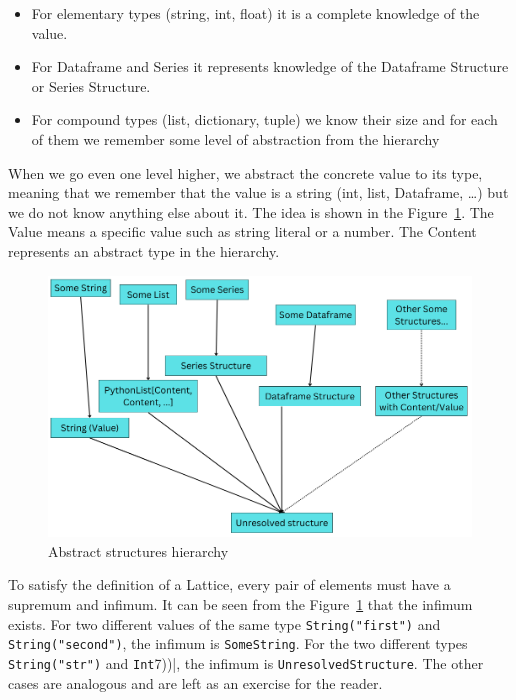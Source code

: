\begin{itemize}
    \item For elementary types (string, int, float) it is a complete knowledge of the value.
    \item For Dataframe and Series it represents knowledge of the Dataframe Structure or Series Structure.
    \item For compound types (list, dictionary, tuple) we know their size and for each of them we remember some level
    of abstraction from the hierarchy
\end{itemize}

When we go even one level higher, we abstract the concrete value to its type, meaning that we remember that the value
is a string (int, list, Dataframe, \ldots) but we do not know anything else about it.
The idea is shown in the Figure~\ref{fig:abstract_hierarchy}.
The Value means a specific value such as string literal or a number.
The Content represents an abstract type in the hierarchy.

\begin{figure}[H]
    \caption{Abstract structures hierarchy}
    \label{fig:abstract_hierarchy}
    \centering
    \includegraphics[scale=0.5]{img/Hierarchy}
\end{figure}

To satisfy the definition of a Lattice, every pair of elements must have a supremum and infimum.
It can be seen from the Figure~\ref{fig:abstract_hierarchy} that the infimum exists.
For two different values of the same type \verb|String("first")| and \verb|String("second")|, the infimum is
\verb|SomeString|.
For the two different types \verb|String("str")| and \verb(Int(7))|, the infimum is \verb|UnresolvedStructure|.
The other cases are analogous and are left as an exercise for the reader.

